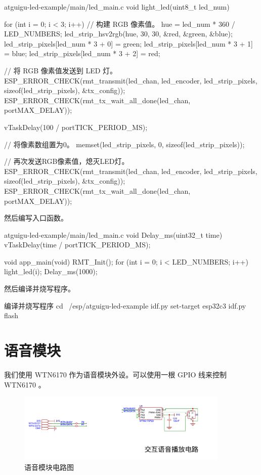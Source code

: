\documentclass[lang=cn,newtx,10pt,scheme=chinese]{elegantbook}
\begin{document}
\begin{mycode}{atguigu-led-example/main/led\_main.c}
void light_led(uint8_t led_num)
{
    for (int i = 0; i < 3; i++)
    {
        // 构建 RGB 像素值。
        hue = led_num * 360 / LED_NUMBERS;
        led_strip_hsv2rgb(hue, 30, 30, &red, &green, &blue);
        led_strip_pixels[led_num * 3 + 0] = green;
        led_strip_pixels[led_num * 3 + 1] = blue;
        led_strip_pixels[led_num * 3 + 2] = red;
    }

    // 将 RGB 像素值发送到 LED 灯。
    ESP_ERROR_CHECK(rmt_transmit(led_chan, led_encoder, led_strip_pixels, sizeof(led_strip_pixels), &tx_config));
    ESP_ERROR_CHECK(rmt_tx_wait_all_done(led_chan, portMAX_DELAY));

    vTaskDelay(100 / portTICK_PERIOD_MS);

    // 将像素数组置为0。
    memset(led_strip_pixels, 0, sizeof(led_strip_pixels));

    // 再次发送RGB像素值，熄灭LED灯。
    ESP_ERROR_CHECK(rmt_transmit(led_chan, led_encoder, led_strip_pixels, sizeof(led_strip_pixels), &tx_config));
    ESP_ERROR_CHECK(rmt_tx_wait_all_done(led_chan, portMAX_DELAY));
}
\end{mycode}

然后编写入口函数。

\begin{mycode}{atguigu-led-example/main/led\_main.c}
void Delay_ms(uint32_t time)
{
    vTaskDelay(time / portTICK_PERIOD_MS);
}

void app_main(void)
{
    RMT_Init();
    for (int i = 0; i < LED_NUMBERS; i++)
    {
        light_led(i);
        Delay_ms(1000);
    }
}
\end{mycode}

然后编译并烧写程序。

\begin{mycode}{编译并烧写程序}
cd ~/esp/atguigu-led-example
idf.py set-target esp32c3
idf.py flash
\end{mycode}

\chapter{语音模块}

我们使用 WTN6170 作为语音模块外设。可以使用一根 GPIO 线来控制 WTN6170 。

\begin{figure}[!htb]
\centering
\includegraphics[width=0.9\textwidth]{WTN6170.png}
\caption{语音模块电路图}
\end{figure}
\end{document}
